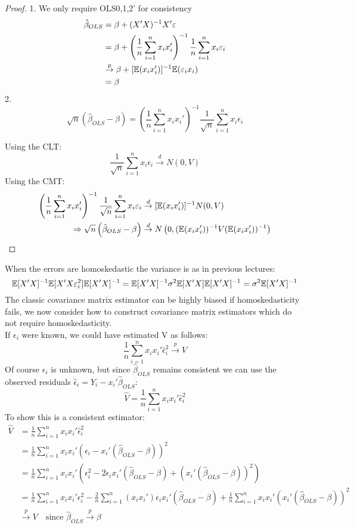 \documentclass[DIV=14,titlepage=false]{scrreprt}
\begin{document}
\begin{proof}
    1. We only require OLS0,1,2' for consistency
    \begin{align*}
        \hat\beta_{OLS} &= \beta + (X'X)^{-1}X'\varepsilon\\
        &= \beta + \left(\frac{1}{n}\sum_{i=1}^{n} x_i x_i'\right)^{-1} \frac{1}{n}\sum_{i=1}^{n} x_i \varepsilon_i\\
        &\overset{p}{\to} \beta + [\mathbb{E}(x_ix_i')]^{-1} \mathbb{E}(\varepsilon_i x_i) \\
        &= \beta
    \end{align*}
    2.
    \[\sqrt{n}\left(\hat\beta_{OLS} - \beta\right) = \left(\frac{1}{n}\sum_{i=1}^{n} x_i x_i'\right)^{-1} \frac{1}{\sqrt{n}}\sum_{i=1}^{n} x_i \epsilon_i \]
    
    Using the CLT: 
    \[ \frac{1}{\sqrt{n}}\sum_{i=1}^{n} x_i \epsilon_i \overset{d}{\to} N(0,V) \]
    Using the CMT: 
    \begin{align*}
        \left(\frac{1}{n}\sum_{i=1}^{n} x_i x_i'\right)^{-1} \frac{1}{\sqrt{n}}\sum_{i=1}^{n} x_i \varepsilon_i & \overset{d}{\to} [\mathbb{E}(x_ix_i')]^{-1} N(0,V)\\
        \Rightarrow \sqrt{n}\left(\hat\beta_{OLS} - \beta\right) & \overset{d}{\to} N\left(0,(\mathbb{E}(x_ix_i'))^{-1}V (\mathbb{E}(x_ix_i'))^{-1}\right)
    \end{align*}
    \end{proof}
When the errors are homoskedastic the variance is as in previous lectures: \[ \mathbb{E}[X'X]^{-1} \mathbb{E}[X'X \varepsilon_i^2] \mathbb{E}[X'X]^{-1} = \mathbb{E}[X'X]^{-1} \sigma^2\mathbb{E}[X'X] \mathbb{E}[X'X]^{-1} = \sigma^2\mathbb{E}[X'X]^{-1} \]
The classic covariance matrix estimator can be highly biased if homoskedasticity fails, we now consider how to construct covariance matrix estimators which do not require homoskedasticity.\\
If $\epsilon_i$ were known, we could have estimated V as follows:
\[ \frac{1}{n} \sum_{i=1}^{n}x_ix_i'\hat \epsilon_i ^2 \overset{p}{\to} V\]
Of course $\epsilon_i$ is unknown, but since $\hat \beta_{OLS}$ remains consistent we can use the observed residuals $\hat \epsilon_i = Y_i - x_i'\hat\beta_{OLS}$:
\[ \hat V = \frac{1}{n} \sum_{i=1}^{n}x_ix_i'\hat \epsilon_i ^2 \]
To show this is a consistent estimator:
\begin{align*}
    \hat V &= \frac{1}{n} \sum_{i=1}^{n}x_ix_i'\hat \epsilon_i ^2\\
     &= \frac{1}{n} \sum_{i=1}^{n}x_ix_i' \left(\epsilon_i-x_i'\left( \hat \beta_{OLS} - \beta \right)\right)^2\\
     &=\frac{1}{n} \sum_{i=1}^{n}x_ix_i' \left( \epsilon_i^2 -2\epsilon_i x_i'\left( \hat \beta_{OLS} - \beta \right) + \left(x_i'\left( \hat \beta_{OLS} - \beta \right)\right)^2\right)\\
     &= \frac{1}{n} \sum_{i=1}^{n}x_ix_i' \epsilon_i^2 -\frac{2}{n}\sum_{i=1}^{n}(x_ix_i')\epsilon_i x_i'\left( \hat \beta_{OLS} - \beta \right) + \frac{1}{n} \sum_{i=1}^{n}x_ix_i' \left(x_i'\left( \hat \beta_{OLS} - \beta \right)\right)^2\\
     &\overset{p}{\to} V \quad \text{since $\hat \beta_{OLS}\overset{p}{\to} \beta$}
\end{align*}
\end{document}

